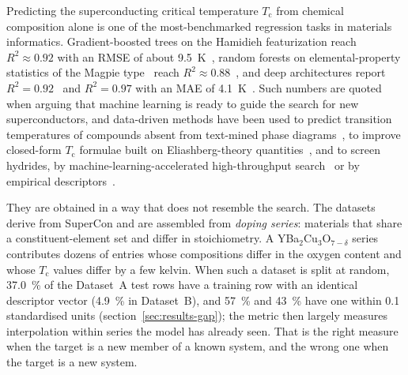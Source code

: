 \documentclass{iopjournal}
\newcommand{\Tc}{T_{\mathrm c}}
\newcommand{\Rsq}{R^{2}}
\begin{document}
Predicting the superconducting critical temperature $\Tc$ from chemical composition alone is one
of the most-benchmarked regression tasks in materials informatics. Gradient-boosted trees on the
Hamidieh featurization reach $\Rsq \approx \num{0.92}$ with an RMSE of about \SI{9.5}{\kelvin}~\cite{hamidieh2018},
random forests on elemental-property statistics of the Magpie type~\cite{ward2016} reach
$\Rsq \approx \num{0.88}$~\cite{stanev2018}, and deep architectures report $\Rsq = \num{0.92}$~\cite{konno2021} and
$\Rsq = \num{0.97}$ with an MAE of \SI{4.1}{\kelvin}~\cite{zeng2019}. Such numbers are quoted when
arguing that machine learning is ready to guide the search for new superconductors, and data-driven
methods have been used to predict transition temperatures of compounds absent from text-mined
phase diagrams~\cite{court2020}, to improve closed-form $\Tc$ formulae built on Eliashberg-theory
quantities~\cite{xie2022}, and to screen hydrides, by machine-learning-accelerated high-throughput
search~\cite{sanna2024} or by empirical descriptors~\cite{wrona2024}.

They are obtained in a way that does not resemble the search. The datasets derive from SuperCon and
are assembled from \emph{doping series}: materials that share a constituent-element set and differ
in stoichiometry. A YBa$_2$Cu$_3$O$_{7-\delta}$ series contributes dozens of entries whose
compositions differ in the oxygen content and whose $\Tc$ values differ by a few kelvin. When such a dataset is split at random, \SI{37.0}{\percent} of the Dataset~A test rows have a training row with an identical descriptor vector (\SI{4.9}{\percent} in Dataset~B), and \SI{57}{\percent} and \SI{43}{\percent} have one within \num{0.1} standardised units (section~\ref{sec:results-gap}); the metric then largely measures interpolation within series the model has already seen. That is the right measure when the target is a new member of a known system, and the wrong one when the target is a new system.
\end{document}
